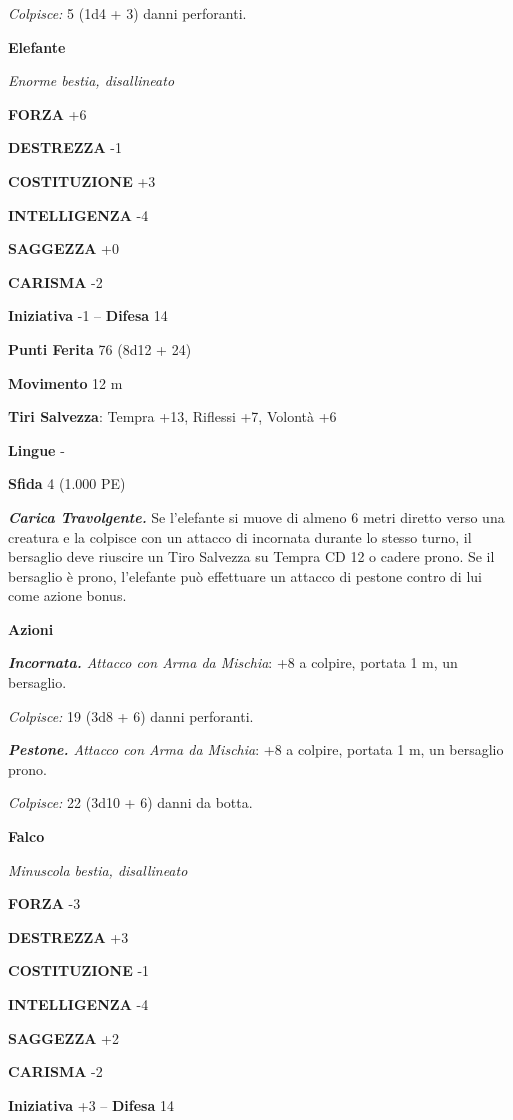 \begin{multicols}{2}
\emph{Colpisce:} 5 (1d4 + 3) danni perforanti.

\medskip\textbf{Elefante}

\emph{Enorme bestia, disallineato}

\textbf{FORZA} +6

\textbf{DESTREZZA} -1

\textbf{COSTITUZIONE} +3

\textbf{INTELLIGENZA} -4

\textbf{SAGGEZZA} +0

\textbf{CARISMA} -2

\textbf{Iniziativa} -1 -- \textbf{Difesa} 14

\textbf{Punti Ferita} 76 (8d12 + 24)

\textbf{Movimento} 12 m

\textbf{Tiri Salvezza}: Tempra +13, Riflessi +7, Volontà +6 

\textbf{Lingue} -

\textbf{Sfida} 4 (1.000 PE)

\emph{\textbf{Carica Travolgente.}} Se l'elefante si muove di almeno 6 metri diretto verso una creatura e la colpisce con un attacco di incornata durante lo stesso turno, il bersaglio deve riuscire un Tiro Salvezza su Tempra CD 12 o cadere prono. Se il bersaglio è prono, l'elefante può effettuare un attacco di pestone contro di lui come azione bonus.

\textbf{Azioni}

\emph{\textbf{Incornata.} Attacco con Arma da Mischia}: +8 a colpire, portata 1 m, un bersaglio.

\emph{Colpisce:} 19 (3d8 + 6) danni perforanti. 

\emph{\textbf{Pestone.} Attacco con Arma da Mischia}: +8 a colpire, portata 1 m, un bersaglio prono.

\emph{Colpisce:} 22 (3d10 + 6) danni da botta.

\medskip\textbf{Falco}

\emph{Minuscola bestia, disallineato}

\textbf{FORZA} -3

\textbf{DESTREZZA} +3

\textbf{COSTITUZIONE} -1

\textbf{INTELLIGENZA} -4

\textbf{SAGGEZZA} +2

\textbf{CARISMA} -2

\textbf{Iniziativa} +3 -- \textbf{Difesa} 14


\end{multicols}
